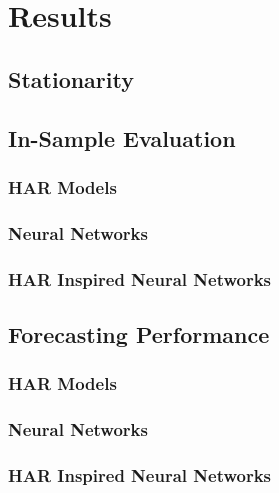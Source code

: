 \chapter{Results}
\label{sec:org3a45938}

\section{Stationarity}

\section{In-Sample Evaluation}
\label{sec:org4b8502a}

\subsection{HAR Models}
\label{sec:org4k85i2a}

\subsection{Neural Networks}
\label{sec:org400991a}

\subsection{HAR Inspired Neural Networks}
\label{sec:org498p2a}

\section{Forecasting Performance}
\label{sec:org75d75a8}

\subsection{HAR Models}
\label{sec:org4i8ii2a}

\subsection{Neural Networks}
\label{sec:org4j2091a}

\subsection{HAR Inspired Neural Networks}
\label{sec:org4o8i2a}
